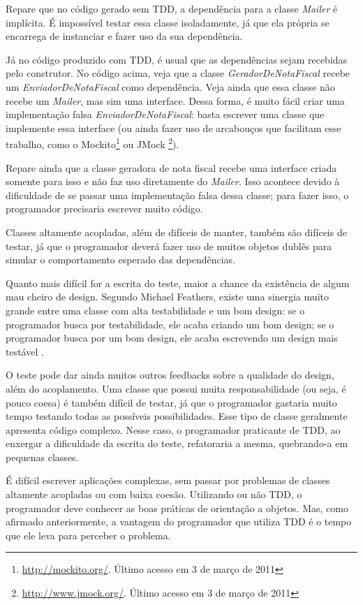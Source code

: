 Repare que no código gerado sem TDD, a dependência para a classe \textit{Mailer}
é implícita. É impossível testar essa classe isoladamente, já que ela própria se
encarrega de instanciar e fazer uso da sua dependência. 

Já no código produzido com TDD, é usual que as dependências sejam recebidas pelo
construtor. No código acima, veja que a classe \textit{GeradorDeNotaFiscal}
recebe um \textit{EnviadorDeNotaFiscal} como dependência. Veja ainda que essa
classe não recebe um \textit{Mailer}, mas sim uma interface. Dessa forma, é
muito fácil criar uma implementação falsa \textit{EnviadorDeNotaFiscal}: basta
escrever uma classe que implemente essa interface (ou ainda fazer uso de
arcabouços que facilitam esse trabalho, como o
Mockito\footnote{\url{http://mockito.org/}. Último acesso em 3 de março de 2011}
ou JMock \footnote{\url{http://www.jmock.org/}. Último acesso em 3 de março de
2011}).

Repare ainda que a classe geradora de nota fiscal recebe uma interface criada
somente para isso e não faz uso diretamente do \textit{Mailer}. Isso acontece
devido à dificuldade de se passar uma implementação falsa dessa classe; para
fazer isso, o programador precisaria escrever muito código.

Classes altamente acopladas, além de difíceis de manter, também são difíceis de
testar, já que o programador deverá fazer uso de muitos objetos dublês para
simular o comportamento esperado das dependências.

Quanto mais difícil for a escrita do teste, maior a chance da existência de
algum mau cheiro de design. Segundo Michael Feathers, existe uma sinergia muito
grande entre uma classe com alta testabilidade e um bom design: se o
programador busca por testabilidade, ele acaba criando um bom design; se o
programador busca por um bom design, ele acaba escrevendo um design mais
testável \cite{feathers-synergy}.

O teste pode dar ainda muitos outros feedbacks sobre a qualidade do design,
além do acoplamento. Uma classe que possui muita responsabilidade (ou seja, é
pouco coesa) é também difícil de testar, já que o programador gastaria muito
tempo testando todas as possíveis possibilidades. Esse tipo de classe geralmente
apresenta código complexo. Nesse caso, o programador praticante de TDD, ao
enxergar a dificuldade da escrita do teste, refatoraria a mesma, quebrando-a em
pequenas classes.

É difícil escrever aplicações complexas, sem passar por problemas de classes
altamente acopladas ou com baixa coesão. Utilizando ou não TDD, o programador
deve conhecer as boas práticas de orientação a objetos. Mas, como afirmado
anteriormente, a vantagem do programador que utiliza TDD é o tempo que ele leva
para perceber o problema.

